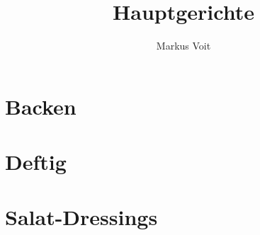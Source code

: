 \documentclass[
  DIV=11,%
  pagesize,%
  fontsize=11pt,%
  paper=a4,%
  numbers=noenddot,
]{scrartcl}
\title{Hauptgerichte}
\author{Markus Voit}
\begin{document}
\maketitle

\tableofcontents
\clearpage

\section{Backen}
\newpage{}
\newpage{}
\newpage{}

\section{Deftig}
\newpage{}
\newpage{}
\newpage{}

\section{Salat-Dressings}
\newpage{}
\end{document}
